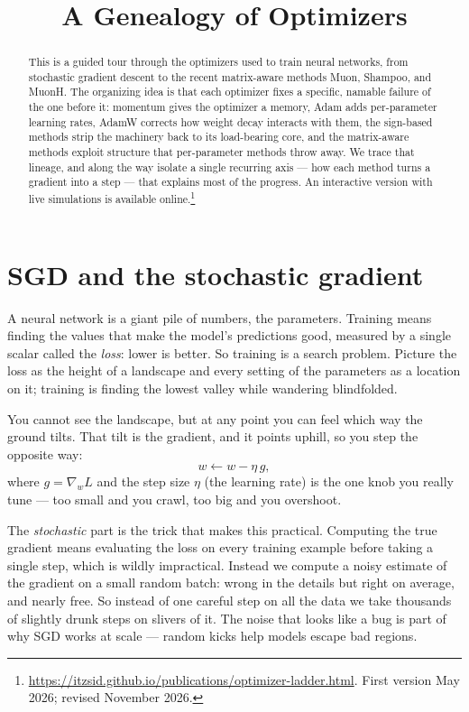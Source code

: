\documentclass[10pt,conference]{IEEEtran}
\title{A Genealogy of Optimizers}
\author{\IEEEauthorblockN{Siddharth Choudhary and Claude (Anthropic)}}
\begin{document}
\maketitle

\begin{abstract}
This is a guided tour through the optimizers used to train neural networks, from
stochastic gradient descent to the recent matrix-aware methods Muon, Shampoo,
and MuonH. The organizing idea is that each optimizer fixes a specific, namable
failure of the one before it: momentum gives the optimizer a memory, Adam adds
per-parameter learning rates, AdamW corrects how weight decay interacts with
them, the sign-based methods strip the machinery back to its load-bearing core,
and the matrix-aware methods exploit structure that per-parameter methods throw
away. We trace that lineage, and along the way isolate a single recurring axis
--- how each method turns a gradient into a step --- that explains most of the
progress. An interactive version with live simulations is available online.\footnote{\url{https://itzsid.github.io/publications/optimizer-ladder.html}. First version May 2026; revised November 2026.}
\end{abstract}

\section{SGD and the stochastic gradient}
A neural network is a giant pile of numbers, the parameters. Training means
finding the values that make the model's predictions good, measured by a single
scalar called the \emph{loss}: lower is better. So training is a search problem.
Picture the loss as the height of a landscape and every setting of the
parameters as a location on it; training is finding the lowest valley while
wandering blindfolded.

You cannot see the landscape, but at any point you can feel which way the ground
tilts. That tilt is the gradient, and it points uphill, so you step the opposite
way:
\begin{equation}
w \leftarrow w - \eta\, g,
\end{equation}
where $g=\nabla_w L$ and the step size $\eta$ (the learning rate) is the one knob
you really tune --- too small and you crawl, too big and you overshoot.

The \emph{stochastic} part is the trick that makes this practical. Computing the
true gradient means evaluating the loss on every training example before taking a
single step, which is wildly impractical. Instead we compute a noisy estimate of
the gradient on a small random batch: wrong in the details but right on average,
and nearly free. So instead of one careful step on all the data we take thousands
of slightly drunk steps on slivers of it. The noise that looks like a bug is part
of why SGD works at scale --- random kicks help models escape bad regions.
\end{document}

